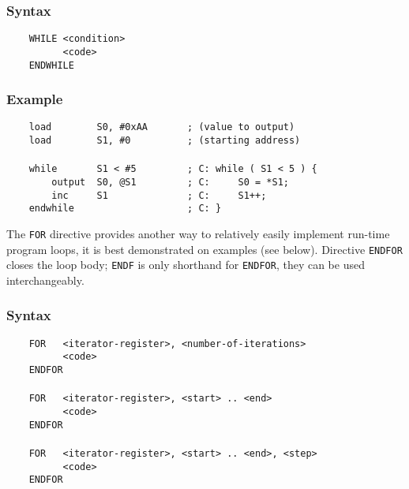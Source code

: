         \subsubsection{Syntax}
            \verb'    WHILE <condition>'\\
            \verb'          <code>'\\
            \verb'    ENDWHILE'

        \subsubsection{Example}
            \verb'    load        S0, #0xAA       ; (value to output)'\\
            \verb'    load        S1, #0          ; (starting address)'\\
            \verb''\\
            \verb'    while       S1 < #5         ; C: while ( S1 < 5 ) {'\\
            \verb'        output  S0, @S1         ; C:     S0 = *S1;'\\
            \verb'        inc     S1              ; C:     S1++;'\\
            \verb'    endwhile                    ; C: }'

    \clearpage
        The \texttt{FOR} directive provides another way to relatively easily implement run-time program loops, it is best demonstrated on examples (see below). Directive \texttt{ENDFOR} closes the loop body; \texttt{ENDF} is only shorthand for \texttt{ENDFOR}, they can be used interchangeably.

        \subsubsection{Syntax}
            \verb'    FOR   <iterator-register>, <number-of-iterations>'\\
            \verb'          <code>'\\
            \verb'    ENDFOR'\\
            \verb''\\
            \verb'    FOR   <iterator-register>, <start> .. <end>'\\
            \verb'          <code>'\\
            \verb'    ENDFOR'\\
            \verb''\\
            \verb'    FOR   <iterator-register>, <start> .. <end>, <step>'\\
            \verb'          <code>'\\
            \verb'    ENDFOR'

